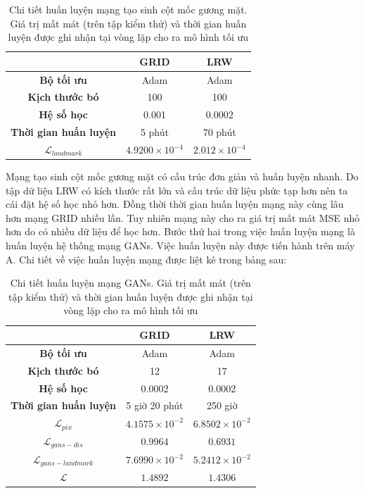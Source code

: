 \begin{table}[h]
    \centering
    \begin{tabular}{c | c | c}
    \hline 
    &\textbf{GRID} & \textbf{LRW}\\
    \hline
    \textbf{Bộ tối ưu} & Adam & Adam\\
    \textbf{Kịch thước bó} & 100 & 100\\
    \textbf{Hệ số học} & 0.001 & 0.0002\\
    \textbf{Thời gian huấn luyện} & 5 phút & 70 phút\\
    \textbf{$\mathcal{L}_{landmark}$} & $4.9200 \times 10^{-4}$ & $2.012 \times 10^{-4}$\\
    \hline
    \end{tabular}
    \caption{Chi tiết huấn luyện mạng tạo sinh cột mốc gương mặt. Giá trị mất mát (trên tập kiểm thử) và thời gian huấn luyện được ghi nhận tại vòng lặp cho ra mô hình tối ưu}
    \label{table:landmark_decoder_training_detail}
\end{table}

Mạng tạo sinh cột mốc gương mặt có cấu trúc đơn giản và huấn luyện nhanh. Do tập dữ liệu LRW có kích thước rất lớn và cấu trúc dữ liệu phức tạp hơn nên ta cái đặt hệ số học nhỏ hơn. Đồng thời thời gian huấn luyện mạng này cùng lâu hơn mạng GRID nhiều lần. Tuy nhiên mạng này cho ra giá trị mất mát MSE nhỏ hơn do có nhiều dữ liệu để học hơn. Bước thứ hai trong việc huấn luyện mạng là huấn luyện hệ thống mạng GANs. Việc huấn luyện này được tiến hành trên máy A. Chi tiết về việc huấn luyện mạng được liệt kê trong bảng sau:

\begin{table}[h]
    \centering
    \begin{tabular}{c | c | c}
    \hline 
    &\textbf{GRID} & \textbf{LRW}\\
    \hline
    \textbf{Bộ tối ưu} & Adam & Adam\\
    \textbf{Kịch thước bó} & 12 & 17\\
    \textbf{Hệ số học} & 0.0002 & 0.0002\\
    \textbf{Thời gian huấn luyện} & 5 giờ 20 phút & 250 giờ\\
    \textbf{$\mathcal{L}_{pix}$} & $4.1575 \times 10^{-2}$ & $6.8502 \times 10^{-2}$\\
    \textbf{$\mathcal{L}_{gans-dis}$} & $0.9964$ & $0.6931$\\
    \textbf{$\mathcal{L}_{gans-landmark}$} & $7.6990 \times 10^{-2}$ & $5.2412 \times 10^{-2}$\\
    \textbf{$\mathcal{L}$} & $1.4892$ & $1.4306$\\
    \hline
    \end{tabular}
    \caption{Chi tiết huấn luyện mạng GANs. Giá trị mất mát (trên tập kiểm thử) và thời gian huấn luyện được ghi nhận tại vòng lặp cho ra mô hình tối ưu}
    \label{table:gans_training_detail}
\end{table}

